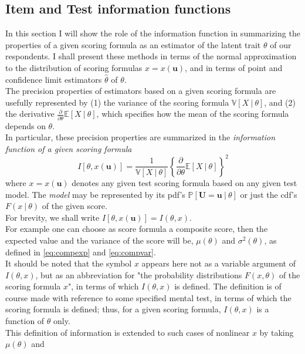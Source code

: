 \subsection{Item and Test information functions}
In this section I will show the role of the information function in summarizing the properties of a given scoring formula as an estimator of the latent trait $\theta$ of our respondents.
I shall present these methods in terms of the normal approximation to the distribution of scoring formulas $x = x(\boldsymbol{u})$, and in terms of point and confidence limit estimators $\hat{\theta}$ of $\theta$.\\
The precision properties of estimators based on a given scoring formula are usefully represented by (1) the variance of the scoring
formula $\mathbb{V}[X \ | \ \theta]$, and (2) the derivative $\frac{\partial}{\partial \theta}\mathbb{E}[X \ | \ \theta]$, which specifies how the mean of the scoring formula depends on $\theta$.\\
In particular, these precision properties are summarized in the \emph{information function of a given scoring formula}
\begin{equation}\label{eq:infoscore}
I[\theta,x(\boldsymbol{u})]=\frac{1}{\mathbb{V}[X \ | \ \theta]} \left\{ \frac{\partial}{\partial \theta}\mathbb{E}[X \ | \ \theta]\right\}^2
\end{equation}
where $x = x(\boldsymbol{u})$ denotes any given test scoring formula based on any given test
model. The \emph{model} may be represented by its pdf's $\mathbb{P}[\boldsymbol{U} = \boldsymbol{u} \ | \ \theta]$ or just the cdf's $F(x\ | \ \theta)$ of the given score.\\
For brevity, we shall write $I[\theta,x(\boldsymbol{u})]=I(\theta,x)$.\\
For example one can choose as score formula a composite score, then the expected value and the variance of the score will be, $\mu(\theta)$ and $\sigma^2(\theta)$, as defined in \eqref{eq:compexp} and \eqref{eq:compvar}.\\
It should be noted that the symbol $x$ appears here not as a variable argument of $I(\theta,x)$, but as an abbreviation for "the probability distributions $F(x, \theta)$ of the scoring formula $x$", in terms of which $I(\theta,x)$ is defined. The definition is of course made with reference to some specified mental test, in terms of which the scoring formula is defined; thus, for a given scoring formula, $I(\theta,x)$ is a function of $\theta$ only.\\
This definition of information is extended to such cases of nonlinear $x$ by taking $\mu(\theta)$ and
